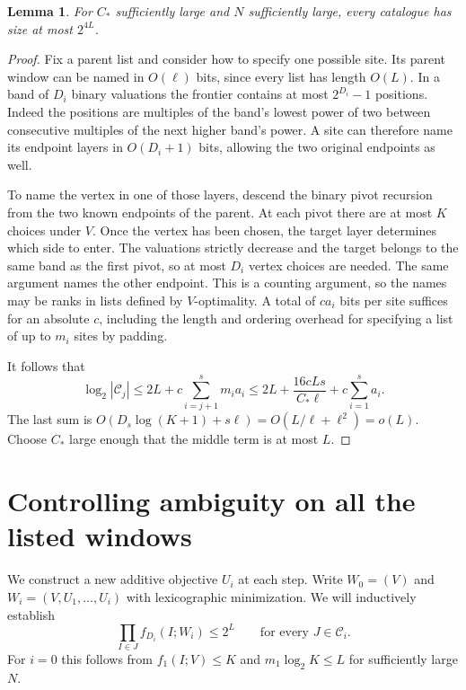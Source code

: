 \documentclass[11pt]{article}
\newtheorem{lemma}[theorem]{Lemma}
\newcommand{\calC}{\mathcal C}
\begin{document}
\begin{lemma}\label{lem:catalogues}
For $C_*$ sufficiently large and $N$ sufficiently large, every catalogue
has size at most $2^{4L}$.
\end{lemma}
\begin{proof}
Fix a parent list and consider how to specify one possible site. Its
parent window can be named in $O(\ell)$ bits, since every list has
length $O(L)$. In a band of $D_i$ binary valuations the frontier contains
at most $2^{D_i}-1$ positions. Indeed the positions are multiples of
the band's lowest power of two between consecutive multiples of the
next higher band's power. A site can therefore name its endpoint layers
in $O(D_i+1)$ bits, allowing the two original endpoints as well.

To name the vertex in one of those layers, descend the binary pivot
recursion from the two known endpoints of the parent. At each pivot
there are at most $K$ choices under $V$. Once the vertex has been
chosen, the target layer determines which side to enter. The valuations
strictly decrease and the target belongs to the same band as the first
pivot, so at most $D_i$ vertex choices are needed. The same argument
names the other endpoint. This is a counting argument, so the names may
be ranks in lists defined by $V$-optimality. A total of $c a_i$ bits
per site suffices for an absolute $c$, including the length and ordering
overhead for specifying a list of up to $m_i$ sites by padding.

It follows that
\[
 \log_2|\calC_j|\le 2L+c\sum_{i=j+1}^{s}m_i a_i
 \le 2L+\frac{16cLs}{C_*\ell}
             +c\sum_{i=1}^{s}a_i .
\]
The last sum is $O(D_s\log(K+1)+s\ell)=O(L/\ell+\ell^2)=o(L)$.
Choose $C_*$ large enough that the middle term is at most $L$.
\end{proof}

\section{Controlling ambiguity on all the listed windows}

We construct a new additive objective $U_i$ at each step. Write
$W_0=(V)$ and $W_i=(V,U_1,\ldots,U_i)$ with lexicographic minimization.
We will inductively establish
\begin{equation}\label{eq:inv}
     \prod_{I\in J} f_{D_i}(I;W_i)\le 2^L
                  \qquad\text{for every }J\in\calC_i .
\end{equation}
For $i=0$ this follows from $f_1(I;V)\le K$ and
$m_1\log_2 K\le L$ for sufficiently large $N$.
\end{document}
